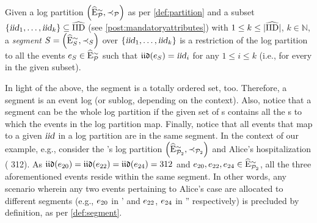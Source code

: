 \begin{newj}
\begin{definition}[Segment]\label{def:segment}
	Given a log partition $\left( \widehat{\mathrm{E}}^{\sim}_{\mathcal{P}}, \prec_{\mathcal{P}} \right)$ as per \cref{def:partition} and a subset $\{\textrm{\textsl{iid}}_1, \ldots, \textrm{\textsl{iid}}_k\} \subseteq \widehat{\mathrm{IID}}$ (see \cref{post:mandatoryattributes}) with $1 \leq k \leq |\widehat{\mathrm{IID}}|$, $k \in \mathbb{N}$, a \emph{segment} $S = \left( \widehat{\mathrm{E}}^{\sim}_{S}, \prec_{S} \right)$ over $\{\textrm{\textsl{iid}}_1, \ldots, \textrm{\textsl{iid}}_k\}$ is a restriction of the log partition to all the events $e_{S} \in \widehat{\mathrm{E}}^{\sim}_{\mathcal{P}}$ such that $\mathfrak{iid}(e_{S}) = \textrm{\textsl{iid}}_i$ for any $1 \leq i \leq k$ (i.e., for every {\CId} in the given subset).
\end{definition}
%
In light of the above, the segment is a totally ordered set, too. Therefore, a segment is an event log (or sublog, depending on the context). Also, notice that a segment can be the whole log partition if the given set of {\CId}s contains all the {\CId}s to which the events in the log partition map. Finally, notice that all events that map to a given $\textrm{\textsl{iid}}$ in a log partition are in the same segment. In the context of our example, e.g., consider the 's log partition $\left( \widehat{\mathrm{E}}^{\sim}_{\mathcal{P}_{2}}, \prec_{\mathcal{P}_{2}} \right)$ and Alice's hospitalization ({\CId} 312). As $\mathfrak{iid}(e_{20}) = \mathfrak{iid}(e_{22}) = \mathfrak{iid}(e_{24}) = 312$ and $ e_{20}, e_{22}, e_{24} \in \widehat{\mathrm{E}}^{\sim}_{\mathcal{P}_2} $, all the three aforementioned events reside within the same segment. In other words, any scenario wherein any two events pertaining to Alice's case are allocated to different segments (e.g., $e_{20}$ in \Segm' and $e_{22}$, $e_{24}$ in \Segm'' respectively) is precluded by definition, as per \cref{def:segment}.



\end{newj}
